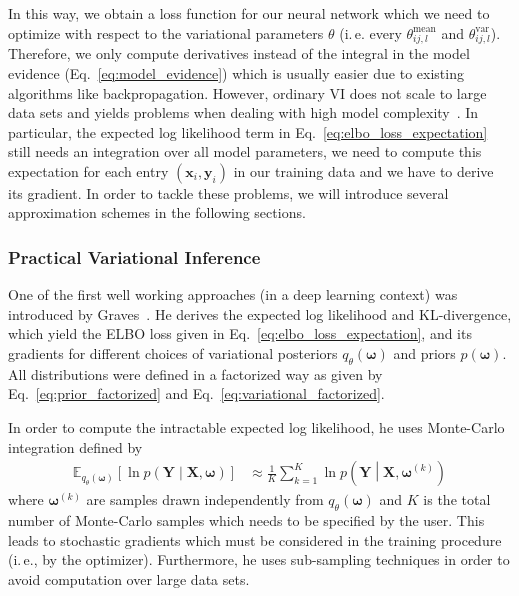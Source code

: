 \documentclass[runningheads]{llncs}
\begin{document}
In this way, we obtain a loss function for our neural network which we need to optimize with respect to the variational parameters $\theta$ (i.\,e. every $\theta^\mathrm{mean}_{ij,l}$ and $\theta^\mathrm{var}_{ij,l}$). 
Therefore, we only compute derivatives instead of the integral in the model evidence (Eq.~\ref{eq:model_evidence}) which is usually easier due to existing algorithms like backpropagation. 
However, ordinary VI does not scale to large data sets and yields problems when dealing with high model complexity~\cite{Gal2016Uncertainty}.
In particular, the expected log likelihood term in Eq.~\ref{eq:elbo_loss_expectation} still needs an integration over all model parameters, we need to compute this expectation for each entry $(\mathbf{x}_i, \mathbf{y}_i)$ in our training data and we have to derive its gradient.
In order to tackle these problems, we will introduce several approximation schemes in the following sections.

\subsubsection{Practical Variational Inference}
\label{parctical_vi}
One of the first well working approaches (in a deep learning context) was introduced by Graves~\cite{Graves2011Practical}.
He derives the expected log likelihood and KL-divergence, which yield the ELBO loss given in Eq.~\ref{eq:elbo_loss_expectation}, and its gradients for different choices of variational posteriors $q_\theta(\boldsymbol{\omega})$ and priors $p(\boldsymbol{\omega})$.
All distributions were defined in a factorized way as given by Eq.~\ref{eq:prior_factorized} and Eq.~\ref{eq:variational_factorized}.

In order to compute the intractable expected log likelihood, he uses Monte-Carlo integration defined by
\begin{align}
    \mathbb{E}_{q_\theta(\boldsymbol{\omega})}\left[ \ln p \left(\mathbf{Y} \middle| \mathbf{X}, \boldsymbol{\omega}\right)\right] &\approx \frac{1}{K} \sum_{k=1}^K \ln p\left(\mathbf{Y} \middle| \mathbf{X, \boldsymbol{\omega}}^{(k)}\right)\label{eq:montecarlo_expectation}
\end{align}
where $\boldsymbol{\omega}^{(k)}$ are samples drawn independently from $q_\theta(\boldsymbol{\omega})$ and $K$ is the total number of Monte-Carlo samples which needs to be specified by the user.
This leads to stochastic gradients which must be considered in the training procedure (i.\,e., by the optimizer).
Furthermore, he uses sub-sampling techniques in order to avoid computation over large data sets.
\end{document}
